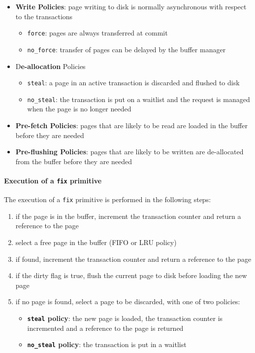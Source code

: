 \documentclass[english]{article}
\begin{document}
\begin{itemize}
  \item \textbf{Write Policies}: page writing to disk is normally asynchronous with respect to the transactions
        \begin{itemize}[label=\textbf{\texttt{>}}]
          \item \texttt{force}: pages are always transferred at commit
          \item \texttt{no\_force}: transfer of pages can be delayed by the buffer manager
        \end{itemize}
  \item D\textbf{e-allocation} Policies
        \begin{itemize}[label=\textbf{\texttt{>}}]
          \item \texttt{steal}: a page in an active transaction is discarded and flushed to disk
          \item \texttt{no\_steal}: the transaction is put on a waitlist and the request is managed when the page is no longer needed
        \end{itemize}
  \item \textbf{Pre-fetch Policies}: pages that are likely to be read are loaded in the buffer before they are needed
  \item \textbf{Pre-flushing Policies}: pages that are likely to be written are de-allocated from the buffer before they are needed
\end{itemize}

\paragraph{Execution of a \texttt{fix} primitive}

The execution of a \texttt{fix} primitive is performed in the following steps:

\begin{enumerate}
  \item if the page is in the buffer, increment the transaction counter and return a reference to the page
  \item select a free page in the buffer (FIFO or LRU policy)
  \item if found, increment the transaction counter and return a reference to the page
  \item if the dirty flag is true, flush the current page to disk before loading the new page
  \item if no page is found, select a page to be discarded, with one of two policies:
        \begin{itemize}[label=\textbf{\texttt{>}}]
          \item \textbf{\texttt{steal} policy}: the new page is loaded, the transaction counter is incremented and a reference to the page is returned
          \item \textbf{\texttt{no\_steal} policy}: the transaction is put in a waitlist
        \end{itemize}
\end{enumerate}
\end{document}
